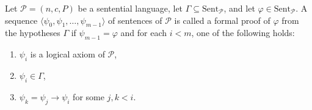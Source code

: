 Let $\mathcal{P} = (n, c, P)$ be a sentential language, let $\Gamma \subseteq \text{Sent}_{\mathcal{P}}$, and let $\varphi \in \text{Sent}_{\mathcal{P}}$. A sequence $\langle \psi_0, \psi_1, \ldots, \psi_{m-1} \rangle$ of sentences of $\mathcal{P}$ is called a formal proof of $\varphi$ from the hypotheses $\Gamma$ if $\psi_{m-1} = \varphi$ and for each $i < m$, one of the following holds:
\begin{enumerate}
\item[(i)] $\psi_i$ is a logical axiom of $\mathcal{P}$,
\item[(ii)] $\psi_i \in \Gamma$,
\item[(iii)] $\psi_k = \psi_j \to \psi_i$ for some $j, k < i$.
\end{enumerate}
